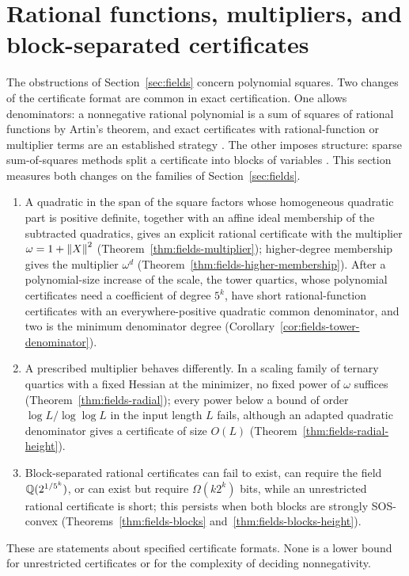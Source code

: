 \section{Rational functions, multipliers, and block-separated certificates}
\label{sec:fields-certificates}

The obstructions of Section~\ref{sec:fields} concern polynomial squares.
Two changes of the certificate format are common in exact certification.
One allows denominators: a nonnegative rational polynomial is a sum of
squares of rational functions by Artin's theorem, and exact certificates with
rational-function or multiplier terms are an established strategy
\cite{KaltofenLiYangZhi2012}. The other imposes structure: sparse
sum-of-squares methods split a certificate into blocks of variables
\cite{KojimaKimWaki2005}. This section measures both changes on the
families of Section~\ref{sec:fields}.
\begin{enumerate}[label=(\alph*)]
\item A quadratic in the span of the square factors whose homogeneous
  quadratic part is positive definite,
  together with an affine ideal membership of the subtracted quadratics,
  gives an explicit rational certificate with the multiplier
  $\omega=1+\left\lVert X\right\rVert^2$ (Theorem~\ref{thm:fields-multiplier}); higher-degree
  membership gives the multiplier $\omega^d$
  (Theorem~\ref{thm:fields-higher-membership}). After a polynomial-size
  increase of the scale, the tower quartics, whose polynomial certificates
  need a coefficient of degree $5^k$, have short rational-function
  certificates with an everywhere-positive quadratic common denominator, and
  two is the minimum denominator degree
  (Corollary~\ref{cor:fields-tower-denominator}).
\item A prescribed multiplier behaves differently. In a scaling family of
  ternary quartics with a fixed Hessian at the minimizer, no fixed power of
  $\omega$ suffices (Theorem~\ref{thm:fields-radial}); every power below a
  bound of order $\log L/\log\log L$ in the input length $L$ fails, although
  an adapted quadratic denominator gives a certificate of size $O(L)$
  (Theorem~\ref{thm:fields-radial-height}).
\item Block-separated rational certificates can fail to exist, can require
  the field $\mathbb Q(2^{1/5^k})$, or can exist but require $\Omega(k2^k)$ bits,
  while an unrestricted rational certificate is short; this persists when both
  blocks are strongly SOS-convex (Theorems~\ref{thm:fields-blocks}
  and~\ref{thm:fields-blocks-height}).
\end{enumerate}
These are statements about specified certificate formats. None is a lower
bound for unrestricted certificates or for the complexity of deciding
nonnegativity.

